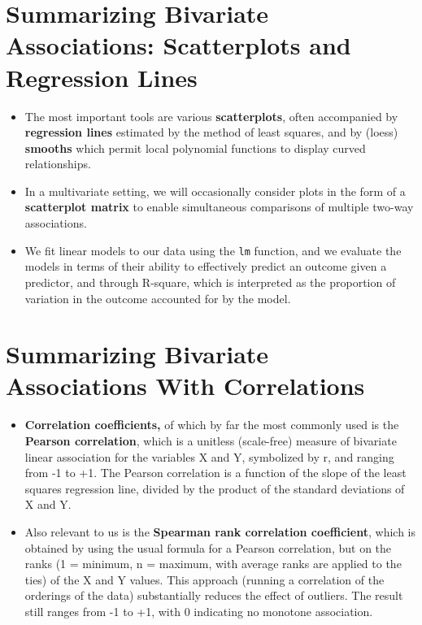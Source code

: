 \documentclass[
]{book}
\providecommand{\tightlist}{%
  \setlength{\itemsep}{0pt}\setlength{\parskip}{0pt}}
\begin{document}
\hypertarget{summarizing-bivariate-associations-scatterplots-and-regression-lines}{%
\section{Summarizing Bivariate Associations: Scatterplots and Regression Lines}\label{summarizing-bivariate-associations-scatterplots-and-regression-lines}}

\begin{itemize}
\tightlist
\item
  The most important tools are various \textbf{scatterplots}, often accompanied by \textbf{regression lines} estimated by the method of least squares, and by (loess) \textbf{smooths} which permit local polynomial functions to display curved relationships.
\item
  In a multivariate setting, we will occasionally consider plots in the form of a \textbf{scatterplot matrix} to enable simultaneous comparisons of multiple two-way associations.
\item
  We fit linear models to our data using the \texttt{lm} function, and we evaluate the models in terms of their ability to effectively predict an outcome given a predictor, and through R-square, which is interpreted as the proportion of variation in the outcome accounted for by the model.
\end{itemize}

\hypertarget{summarizing-bivariate-associations-with-correlations}{%
\section{Summarizing Bivariate Associations With Correlations}\label{summarizing-bivariate-associations-with-correlations}}

\begin{itemize}
\tightlist
\item
  \textbf{Correlation coefficients,} of which by far the most commonly used is the \textbf{Pearson correlation}, which is a unitless (scale-free) measure of bivariate linear association for the variables X and Y, symbolized by r, and ranging from -1 to +1. The Pearson correlation is a function of the slope of the least squares regression line, divided by the product of the standard deviations of X and Y.
\item
  Also relevant to us is the \textbf{Spearman rank correlation coefficient}, which is obtained by using the usual formula for a Pearson correlation, but on the ranks (1 = minimum, n = maximum, with average ranks are applied to the ties) of the X and Y values. This approach (running a correlation of the orderings of the data) substantially reduces the effect of outliers. The result still ranges from -1 to +1, with 0 indicating no monotone association.
\end{itemize}
\end{document}
